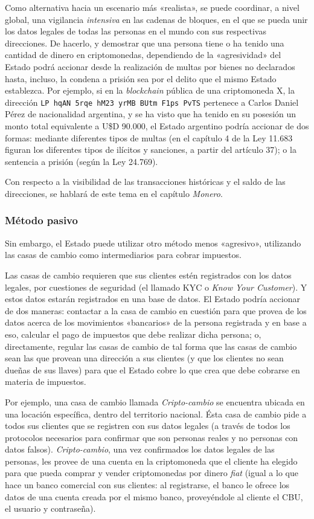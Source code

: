 \documentclass[12pt,a4paper,twoside]{book}
\begin{document}
Como alternativa hacia un escenario más «realista», se puede coordinar, a nivel global, una vigilancia \textit{intensiva} en las cadenas de bloques, en el que se pueda unir los datos legales de todas las personas en el mundo con sus respectivas direcciones. De hacerlo, y demostrar que una persona tiene o ha tenido una cantidad de dinero en criptomonedas, dependiendo de la «agresividad» del Estado podrá accionar desde la realización de multas por bienes no declarados hasta, incluso, la condena a prisión sea por el delito que el mismo Estado establezca. Por ejemplo, si en la \textit{blockchain} pública de una criptomoneda X, la dirección \texttt{LP hqAN 5rqe hM23 yrMB BUtm F1ps PvTS} pertenece a Carlos Daniel Pérez de nacionalidad argentina, y se ha visto que ha tenido en su posesión un monto total equivalente a U\$D 90.000, el Estado argentino podría accionar de dos formas: mediante diferentes tipos de multas (en el capítulo 4 de la Ley 11.683 figuran los diferentes tipos de ilícitos y sanciones, a partir del artículo 37); o la sentencia a prisión (según la Ley 24.769). 

Con respecto a la visibilidad de las transacciones históricas y el saldo de las direcciones, se hablará de este tema en el capítulo \textit{Monero}.

\subsubsection{Método pasivo}
Sin embargo, el Estado puede utilizar otro método menos «agresivo», utilizando las casas de cambio como intermediarios para cobrar impuestos.

Las casas de cambio requieren que sus clientes estén registrados con los datos legales, por cuestiones de seguridad (el llamado KYC o \textit{Know Your Customer}). Y estos datos estarán registrados en una base de datos. El Estado podría accionar de dos maneras: contactar a la casa de cambio en cuestión para que provea de los datos acerca de los movimientos «bancarios» de la persona registrada y en base a eso, calcular el pago de impuestos que debe realizar dicha persona; o, directamente, regular las casas de cambio de tal forma que las casas de cambio sean las que provean una dirección a sus clientes (y que los clientes no sean dueñas de sus llaves) para que el Estado cobre lo que crea que debe cobrarse en materia de impuestos.

Por ejemplo, una casa de cambio llamada \textit{Cripto-cambio} se encuentra ubicada en una locación específica, dentro del territorio nacional. Ésta casa de cambio pide a todos sus clientes que se registren con sus datos legales (a través de todos los protocolos necesarios para confirmar que son personas reales y no personas con datos falsos). \textit{Cripto-cambio}, una vez confirmados los datos legales de las personas, les provee de una cuenta en la criptomoneda que el cliente ha elegido para que pueda comprar y vender criptomonedas por dinero \textit{fiat} (igual a lo que hace un banco comercial con sus clientes: al registrarse, el banco le ofrece los datos de una cuenta creada por el mismo banco, proveyéndole al cliente el CBU, el usuario y contraseña).
\end{document}
